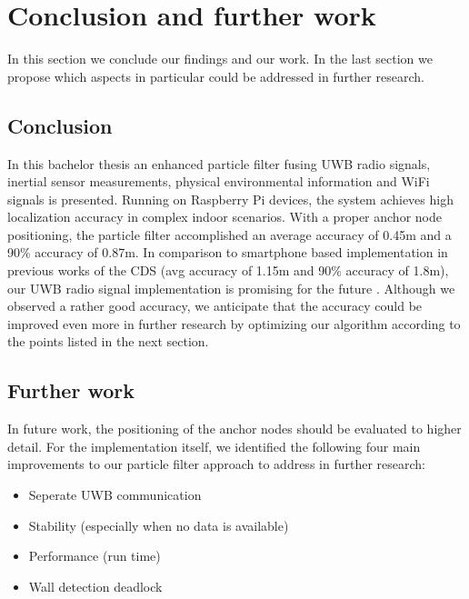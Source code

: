 
\chapter{Conclusion and further work} %

\label{Chapter6} %
In this section we conclude our findings and our work. In the last section we propose which aspects in particular could be addressed in further research. 


\section{Conclusion}
In this bachelor thesis an enhanced particle filter fusing UWB radio signals, inertial sensor measurements, physical environmental information and WiFi signals is presented. Running on Raspberry Pi devices, the system achieves high localization accuracy in complex indoor scenarios. With a proper anchor node positioning, the particle filter accomplished an average accuracy of 0.45m and a 90\% accuracy of 0.87m. In comparison to smartphone based implementation in previous works of the CDS (avg accuracy of 1.15m and 90\% accuracy of 1.8m), our UWB radio signal implementation is promising for the future \cite{Carrera}. Although we observed a rather good accuracy, we anticipate that the accuracy could be improved even more in further research by optimizing our algorithm according to the points listed in the next section.



\section{Further work}
In future work, the positioning of the anchor nodes should be evaluated to higher detail. For the implementation itself, we identified the following four main improvements to our particle filter approach to address in further research:
\begin{itemize}
\item Seperate UWB communication
\item Stability (especially when no data is available)
\item Performance (run time)
\item Wall detection deadlock
\end{itemize}

